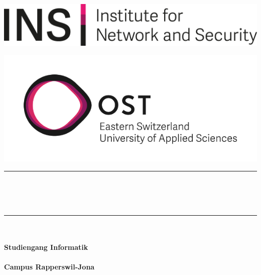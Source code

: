 



\begin{titlepage}


   \newcommand{\HRule}{\color{black}\rule{\linewidth}{0.5mm}} %

   \center

   \begin{minipage}{0.49\linewidth}
      \vspace{2pt}
      \includegraphics[width=0.8\linewidth]{img/INS_Icon}
      \hfill
   \end{minipage}
   \begin{minipage}{0.49\linewidth}
      \hfill
      \includegraphics[width=0.6\linewidth]{img/OST_Icon}
   \end{minipage}

   \vspace*{\fill}

   \vspace{1.5cm}

   {\HRule} \\[0.7cm]
   {\Huge \bfseries \TITLE}\\[0.4cm]
   {\huge \bfseries \SUBTITLE}\\[0.4cm]

   {\HRule} \\[1.5cm]

   \textbf{\textsc{\Huge \SUBJECT}}\\[1.5cm]

   \Large
   \textbf{Studiengang Informatik}\\
   \textbf{\INSTITUTE}\\
   \textbf{Campus Rapperswil-Jona}\\


\end{titlepage}
